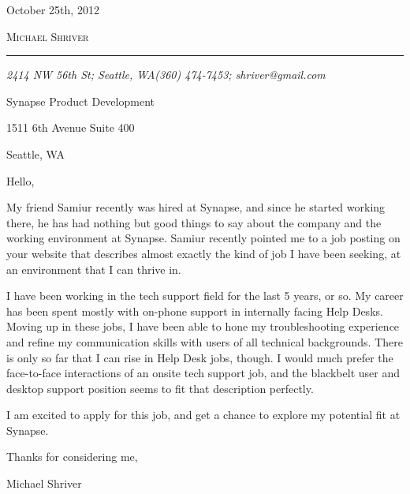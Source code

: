 \documentclass[10pt,oneside]{article}
\makeatletter
\newcommand{\name}{Michael Shriver}
\newcommand{\dte}{October 25th, 2012}
\newcommand{\addr}{2414 NW 56th St; Seattle, WA}
\newcommand{\phone}{(360) 474-7453}
\newcommand{\email}{shriver@gmail.com}
\newcommand{\bigname}[1]{
	\begin{flushleft}\fontfamily{phv}\selectfont\Huge\scshape#1\end{flushleft}
}
\makeatother
\begin{document}
 \selectfont

\hfill\dte

\bigname{\name}


\vspace{-8pt} \rule{\textwidth}{1pt}

\vspace{-1pt} {\small\itshape \addr \hfill \phone; \email}

\vspace{8 pt}


\vspace{\baselineskip}

Synapse Product Development

1511 6th Avenue Suite 400

Seattle, WA

\vspace{\baselineskip}
\vspace{\baselineskip}

Hello,

\vspace{\baselineskip}

My friend Samiur recently was hired at Synapse, and since he started working there, he has had nothing but good things to say about the company and the working environment at Synapse. Samiur recently pointed me to a job posting on your website that describes almost exactly the kind of job I have been seeking, at an environment that I can thrive in.

\vspace{\baselineskip}

I have been working in the tech support field for the last 5 years, or so. My career has been spent mostly with on-phone support in internally facing Help Desks. Moving up in these jobs, I have been able to hone my troubleshooting experience and refine my communication skills with users of all technical backgrounds. There is only so far that I can rise in Help Desk jobs, though. I would much prefer the face-to-face interactions of an onsite tech support job, and the blackbelt user and desktop support position seems to fit that description perfectly.

\vspace{\baselineskip}

I am excited to apply for this job, and get a chance to explore my potential fit at Synapse.

\vspace{\baselineskip}

Thanks for considering me,

\vspace{\baselineskip}

Michael Shriver
\end{document}
